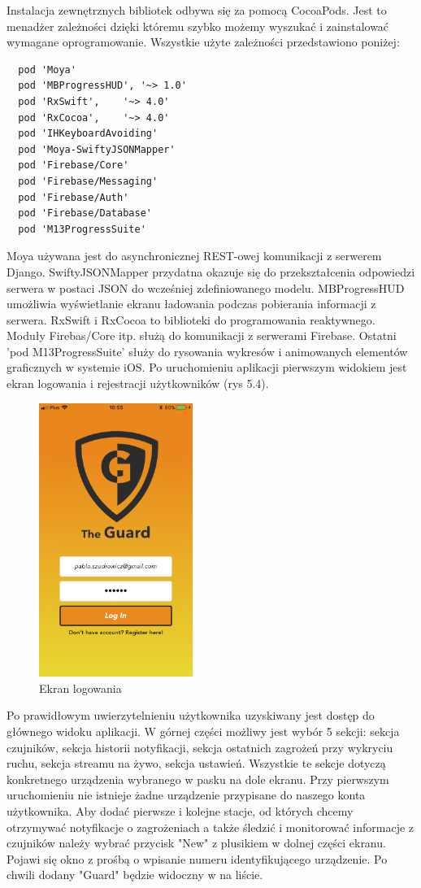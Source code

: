 Instalacja zewnętrznych bibliotek odbywa się za pomocą CocoaPods. Jest to menadżer zależności dzięki któremu szybko możemy wyszukać i zainstalować wymagane oprogramowanie. Wszystkie użyte zależności przedstawiono poniżej: 
\begin{verbatim}
  pod 'Moya'
  pod 'MBProgressHUD', '~> 1.0'
  pod 'RxSwift',    '~> 4.0'
  pod 'RxCocoa',    '~> 4.0'
  pod 'IHKeyboardAvoiding'
  pod 'Moya-SwiftyJSONMapper'
  pod 'Firebase/Core'
  pod 'Firebase/Messaging'
  pod 'Firebase/Auth'
  pod 'Firebase/Database'
  pod 'M13ProgressSuite'
\end{verbatim}
Moya używana jest do asynchronicznej REST-owej komunikacji z serwerem Django. SwiftyJSONMapper przydatna okazuje się do przekształcenia odpowiedzi serwera w postaci JSON do wcześniej zdefiniowanego modelu. MBProgressHUD umożliwia wyświetlanie ekranu ładowania podczas pobierania informacji z serwera. RxSwift i RxCocoa to biblioteki do programowania reaktywnego. Moduły Firebas/Core itp. służą do komunikacji z serwerami Firebase. Ostatni 'pod M13ProgressSuite' służy do rysowania wykresów i animowanych elementów graficznych w systemie iOS.
Po uruchomieniu aplikacji pierwszym widokiem jest ekran logowania i rejestracji użytkowników (rys 5.4). 
\begin{figure}[ht]
	\centering
	\includegraphics[width=5cm]{ios_screenshots/login.png}
	\caption{Ekran logowania}
\end{figure}
Po prawidłowym uwierzytelnieniu użytkownika uzyskiwany jest dostęp do głównego widoku aplikacji. W górnej części możliwy jest wybór 5 sekcji:
sekcja czujników, sekcja historii notyfikacji, sekcja ostatnich zagrożeń przy wykryciu ruchu, sekcja streamu na żywo, sekcja ustawień. Wszystkie te sekcje dotyczą konkretnego urządzenia wybranego w pasku na dole ekranu. Przy pierwszym uruchomieniu nie istnieje żadne urządzenie przypisane do naszego konta użytkownika. Aby dodać pierwsze i kolejne stacje, od których chcemy otrzymywać notyfikacje o zagrożeniach a także śledzić i monitorować informacje z czujników należy wybrać przycisk "New" z plusikiem w dolnej części ekranu. Pojawi się okno z prośbą o wpisanie numeru identyfikującego urządzenie. Po chwili dodany "Guard" będzie widoczny w na liście.
